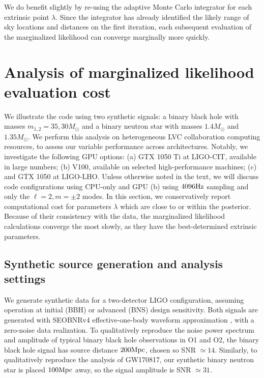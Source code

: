 \documentclass[twocolumn,prd,nofootinbib]{revtex4}
\newcommand\unit[1]{{\rm #1}}
\begin{document}
We do benefit slightly by re-using the adaptive Monte Carlo integrator for each extrinsic point $\lambda$.  Since the
integrator has already identified the likely range of sky locations and distances on the first iteration, each
subsequent evaluation of the marginalized likelihood can converge marginally more quickly.



\section{Analysis of marginalized likelihood evaluation cost}
\label{sec:demo}

We illustrate the code using two synthetic signals: a binary black hole with masses $m_{1,2}=35,30 M_\odot$ and a binary
neutron star with masses $1.4 M_\odot$ and $1.35 M_\odot$.
 We perform this analysis on heterogeneous LVC collaboration computing resources, to assess our variable
performance across architectures.  Notably, we investigate the following GPU options: (a) GTX 1050 Ti at LIGO-CIT,
available in large numbers; (b) V100, available on selected high-performance machines; (c) and
GTX 1050 at LIGO-LHO.    Unless otherwise noted in the text, we will discuss code configurations using CPU-only and GPU (b) using
$4096\unit{Hz}$ sampling and only the  $\ell=2, m=\pm 2$ modes.  In this section, we  conservatively report computational cost for
parameters $\lambda$ which are close to or within the posterior.  Because of their consistency with the data, 
the marginalized likelihood calculations converge the most slowly, as they have the best-determined extrinsic
parameters.


\subsection{Synthetic source generation and analysis settings}


We generate  synthetic data for a two-detector LIGO configuration, assuming operation at  initial (BBH) or advanced (BNS) design  sensitivity.
Both signals are generated with SEOBNRv4 effective-one-body waveform approximation \cite{2017PhRvD..95d4028B}, with a zero-noise data realization.   
To qualitatively reproduce the noise power spectrum and amplitude of typical binary black hole observations in O1 and
O2, the binary black hole signal has source distance $200 \unit{Mpc}$, chosen so SNR $\simeq 14$.  
Similarly, to qualitatively reproduce the analysis of GW170817, our synthetic binary neutron star is placed $100
\unit{Mpc}$ away, so the signal amplitude is SNR $\simeq 31$.
\end{document}
